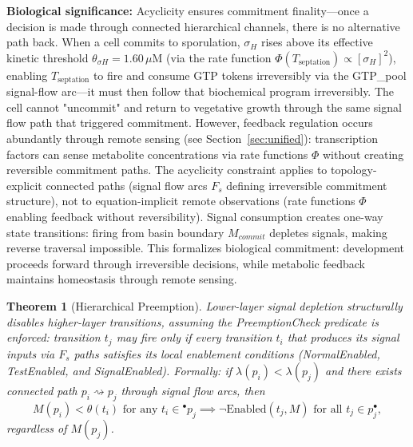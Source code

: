 \documentclass[10pt,letterpaper]{article}
\newtheorem{theorem}{Theorem}
\begin{document}
\textbf{Biological significance:} Acyclicity ensures commitment finality---once a decision is made through connected hierarchical channels, there is no alternative path back.
When a cell commits to sporulation, $\sigma_H$ rises above its effective kinetic threshold $\theta_{\sigma H} = 1.60\,\mu$M (via the rate function $\Phi(T_{\text{septation}}) \propto [\sigma_H]^2$), enabling $T_{\text{septation}}$ to fire and consume GTP tokens irreversibly via the GTP\_pool signal-flow arc---it must then follow that biochemical program irreversibly. The cell cannot "uncommit" and return to vegetative growth through the same signal flow path that triggered commitment. However, feedback regulation occurs abundantly through remote sensing (see Section~\ref{sec:unified}): transcription factors can sense metabolite concentrations via rate functions $\Phi$ without creating reversible commitment paths. The acyclicity constraint applies to topology-explicit connected paths (signal flow arcs $F_s$ defining irreversible commitment structure), not to equation-implicit remote observations (rate functions $\Phi$ enabling feedback without reversibility). Signal consumption creates one-way state transitions: firing from basin boundary $M_{commit}$ depletes signals, making reverse traversal impossible. This formalizes biological commitment: development proceeds forward through irreversible decisions, while metabolic feedback maintains homeostasis through remote sensing.

\begin{theorem}[Hierarchical Preemption]
Lower-layer signal depletion structurally disables higher-layer transitions,
assuming the PreemptionCheck predicate is enforced: transition $t_j$ may fire
only if every transition $t_i$ that produces its signal inputs via $F_s$ paths
satisfies its local enablement conditions (NormalEnabled, TestEnabled, and
SignalEnabled).
Formally: if $\lambda(p_i) < \lambda(p_j)$ and there exists connected path $p_i \rightsquigarrow p_j$ through signal flow arcs, then
\[
M(p_i) < \theta(t_i) \text{ for any } t_i \in {}^\bullet p_j \implies \neg\text{Enabled}(t_j, M) \text{ for all } t_j \in p_j^\bullet,
\]
regardless of $M(p_j)$.
\end{theorem}
\end{document}
